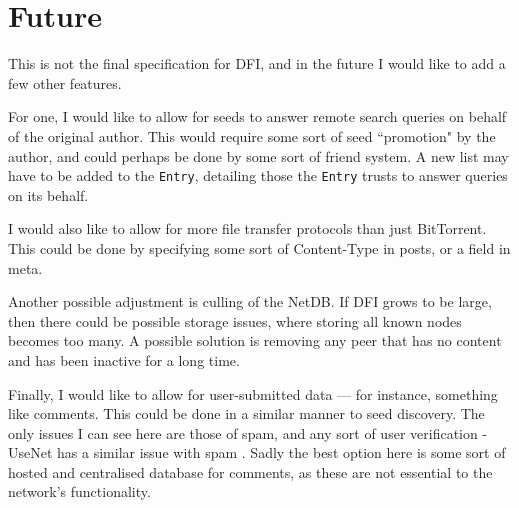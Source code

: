 \section{Future}
\begin{multicols}{2}
This is not the final specification for DFI, and in the future I would like to
add a few other features. 

For one, I would like to allow for seeds to answer remote search queries on
behalf of the original author. This would require some sort of seed ``promotion"
by the author, and could perhaps be done by some sort of friend system. A new
list may have to be added to the \texttt{Entry}, detailing those the \texttt{Entry} trusts to
answer queries on its behalf.

I would also like to allow for more file transfer protocols than just
BitTorrent. This could be done by specifying some sort of Content-Type in posts,
or a field in meta.

Another possible adjustment is culling of the NetDB. If DFI grows to be large,
then there could be possible storage issues, where storing all known nodes
becomes too many. A possible solution is removing any peer that has no content
and has been inactive for a long time.

Finally, I would like to allow for user-submitted data --- for instance, something
like comments. This could be done in a similar manner to seed discovery. The
only issues I can see here are those of spam, and any sort of user verification
- UseNet has a similar issue with spam \cite{spam}. Sadly the best option 
here is some sort of hosted and centralised database for comments, as these
are not essential to the network's functionality.
\end{multicols}
